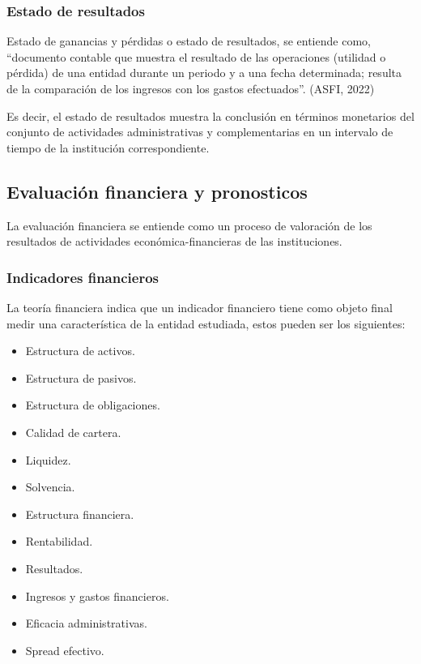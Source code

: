 \documentclass[
  12pt,
]{article}
\providecommand{\tightlist}{%
  \setlength{\itemsep}{0pt}\setlength{\parskip}{0pt}}
\begin{document}
\hypertarget{estado-de-resultados}{%
\subsubsection{Estado de resultados}\label{estado-de-resultados}}

Estado de ganancias y pérdidas o estado de resultados, se entiende como,
``documento contable que muestra el resultado de las operaciones
(utilidad o pérdida) de una entidad durante un periodo y a una fecha
determinada; resulta de la comparación de los ingresos con los gastos
efectuados''. (ASFI, 2022)

Es decir, el estado de resultados muestra la conclusión en términos
monetarios del conjunto de actividades administrativas y complementarias
en un intervalo de tiempo de la institución correspondiente.

\hypertarget{evaluaciuxf3n-financiera-y-pronosticos}{%
\subsection{Evaluación financiera y
pronosticos}\label{evaluaciuxf3n-financiera-y-pronosticos}}

La evaluación financiera se entiende como un proceso de valoración de
los resultados de actividades económica-financieras de las
instituciones.

\hypertarget{indicadores-financieros}{%
\subsubsection{Indicadores financieros}\label{indicadores-financieros}}

La teoría financiera indica que un indicador financiero tiene como
objeto final medir una característica de la entidad estudiada, estos
pueden ser los siguientes:

\begin{itemize}
\tightlist
\item
  Estructura de activos.
\item
  Estructura de pasivos.
\item
  Estructura de obligaciones.
\item
  Calidad de cartera.
\item
  Liquidez.
\item
  Solvencia.
\item
  Estructura financiera.
\item
  Rentabilidad.
\item
  Resultados.
\item
  Ingresos y gastos financieros.
\item
  Eficacia administrativas.
\item
  Spread efectivo.
\end{itemize}
\end{document}
